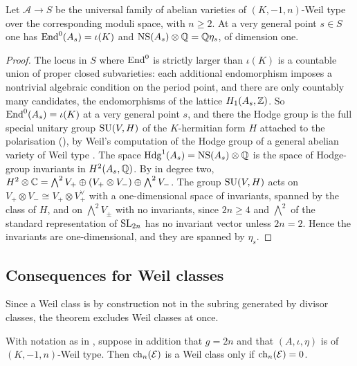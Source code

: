 \begin{lemma}\label{lem:genericNS}
Let $\mathcal{A}\to S$ be the universal family of abelian varieties of
$(K,-1,n)$-Weil type over the corresponding moduli space, with $n\ge2$. At a
very general point $s\in S$ one has $\operatorname{End}^{0}(A_{s})=\iota(K)$ and
$\mathrm{NS}(A_{s})\otimes\mathbb{Q}=\mathbb{Q}\eta_{s}$, of dimension one.
\end{lemma}

\begin{proof}
The locus in $S$ where $\operatorname{End}^{0}$ is strictly larger than $\iota(K)$ is a
countable union of proper closed subvarieties: each additional endomorphism
imposes a nontrivial algebraic condition on the period point, and there are
only countably many candidates, the endomorphisms of the lattice
$H_{1}(A_{s},\mathbb{Z})$. So $\operatorname{End}^{0}(A_{s})=\iota(K)$ at a very general point
$s$, and there the Hodge group is the full special unitary group
$\operatorname{SU}(V,H)$ of the $K$-hermitian form $H$ attached to the
polarisation (), by Weil's computation of the Hodge group of a general abelian
variety of Weil type \cite{Weil77}. The space
$\mathrm{Hdg}^{1}(A_{s})=\mathrm{NS}(A_{s})\otimes\mathbb{Q}$ is the space of Hodge-group invariants
in $H^{2}(A_{s},\mathbb{Q})$. By  in degree two,
$H^{2}\otimes\mathbb{C}=\bigwedge^{2}V_{+}\oplus(V_{+}\otimes V_{-})\oplus\bigwedge^{2}V_{-}$.
The group $\operatorname{SU}(V,H)$ acts on $V_{+}\otimes V_{-}\cong V_{+}\otimes V_{+}^{\vee}$
with a one-dimensional space of invariants, spanned by the class of $H$, and on
$\bigwedge^{2}V_{\pm}$ with no invariants, since $2n\ge4$ and $\bigwedge^{2}$
of the standard representation of $\operatorname{SL}_{2n}$ has no invariant vector
unless $2n=2$. Hence the invariants are one-dimensional, and they are spanned
by $\eta_{s}$.
\end{proof}

\subsection{Consequences for Weil classes}

Since a Weil class is by construction not in the subring generated by divisor
classes, the theorem excludes Weil classes at once.

\begin{corollary}\label{cor:neverweil}
With notation as in , suppose in addition that $g=2n$ and
that $(A,\iota,\eta)$ is of $(K,-1,n)$-Weil type. Then $\operatorname{ch}_{n}(\mathcal{E})$ is a
Weil class only if $\operatorname{ch}_{n}(\mathcal{E})=0$.
\end{corollary}

